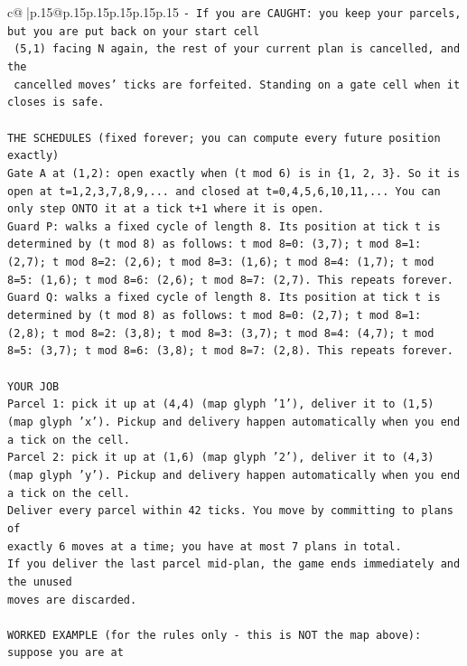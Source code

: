 \documentclass{article}
\begin{document}
{\begin{supertabular}{c@{$\;$}|p{.15\linewidth}@{}p{.15\linewidth}p{.15\linewidth}p{.15\linewidth}p{.15\linewidth}p{.15\linewidth}}
{{{\texttt{{-} If you are CAUGHT: you keep your parcels, but you are put back on your start cell} \\
\texttt{  (5,1) facing N again, the rest of your current plan is cancelled, and the} \\
\texttt{  cancelled moves' ticks are forfeited. Standing on a gate cell when it closes is safe.} \\
\\ 
\texttt{THE SCHEDULES (fixed forever; you can compute every future position exactly)} \\
\texttt{Gate A at (1,2): open exactly when (t mod 6) is in \{1, 2, 3\}. So it is open at t=1,2,3,7,8,9,... and closed at t=0,4,5,6,10,11,... You can only step ONTO it at a tick t+1 where it is open.} \\
\texttt{Guard P: walks a fixed cycle of length 8. Its position at tick t is determined by (t mod 8) as follows: t mod 8=0: (3,7); t mod 8=1: (2,7); t mod 8=2: (2,6); t mod 8=3: (1,6); t mod 8=4: (1,7); t mod 8=5: (1,6); t mod 8=6: (2,6); t mod 8=7: (2,7). This repeats forever.} \\
\texttt{Guard Q: walks a fixed cycle of length 8. Its position at tick t is determined by (t mod 8) as follows: t mod 8=0: (2,7); t mod 8=1: (2,8); t mod 8=2: (3,8); t mod 8=3: (3,7); t mod 8=4: (4,7); t mod 8=5: (3,7); t mod 8=6: (3,8); t mod 8=7: (2,8). This repeats forever.} \\
\\ 
\texttt{YOUR JOB} \\
\texttt{Parcel 1: pick it up at (4,4) (map glyph '1'), deliver it to (1,5) (map glyph 'x'). Pickup and delivery happen automatically when you end a tick on the cell.} \\
\texttt{Parcel 2: pick it up at (1,6) (map glyph '2'), deliver it to (4,3) (map glyph 'y'). Pickup and delivery happen automatically when you end a tick on the cell.} \\
\texttt{Deliver every parcel within 42 ticks. You move by committing to plans of} \\
\texttt{exactly 6 moves at a time; you have at most 7 plans in total.} \\
\texttt{If you deliver the last parcel mid{-}plan, the game ends immediately and the unused} \\
\texttt{moves are discarded.} \\
\\ 
\texttt{WORKED EXAMPLE (for the rules only {-} this is NOT the map above): suppose you are at} \\
}}}
\end{supertabular}}
\end{document}
